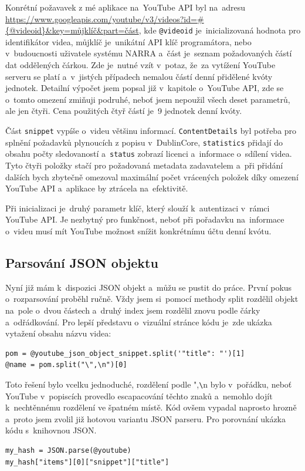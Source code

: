 \par Konrétní požavavek z mé aplikace na~YouTube API byl na~adresu \url{https://www.googleapis.com/youtube/v3/videos?id=#{@videoid}&key=můjklíč}\hfill \break \url{&part=část}\cite{apiurl}, kde \texttt{@videoid} je~inicializovaná hodnota pro identifikátor videa, můjklíč je~unikátní API klíč programátora, nebo v~budoucnosti uživatele systému NARRA a~část je~seznam požadovaných částí dat oddělených čárkou. Zde je~nutné vzít v~potaz, že~za vytížení YouTube serveru se platí a~v~jistých případech nemalou částí denní přidělené kvóty\cite{googleconsole1} jednotek. Detailní výpočet jsem popsal již v~kapitole o~YouTube API, zde se o~tomto omezení zmiňuji podruhé, neboť jsem nepoužil všech deset parametrů, ale jen čtyři. Cena použitých čtyř částí je~9 jednotek denní kvóty.
\par Část \texttt{snippet} vypíše o~videu většinu informací. \texttt{ContentDetails} byl potřeba pro splnění požadavků plynoucích z popisu v~DublinCore, \texttt{statistics} přidají do obsahu počty sledovaností a~\texttt{status} zobrazí licenci a~informace o~sdílení videa. Tyto čtyři položky stačí pro požadovaná metadata zadavatelem a~při přidání dalších bych zbytečně omezoval maximální počet vrácených položek díky omezení YouTube API a~aplikace by ztrácela na~efektivitě.
\par Při inicializaci je~druhý parametr klíč, který slouží k~autentizaci v~rámci YouTube API. Je nezbytný pro funkčnost, neboť při pořadavku na~informace o~videu musí mít YouTube možnost snížit konkrétnímu účtu denní kvótu.

\subsection{Parsování JSON objektu}
\par Nyní již mám k~dispozici JSON objekt a~můžu se pustit do práce. První pokus o~rozparsování proběhl ručně. Vždy jsem si~pomocí methody split rozdělil objekt na~pole o~dvou částech a~druhý index jsem rozdělil znovu podle čárky a~odřádkování. Pro lepší představu o~vizuální stránce kódu je~zde ukázka vytažení obsahu názvu videa:
\begin{verbatim}
pom = @youtube_json_object_snippet.split('"title": "')[1]
@name = pom.split("\",\n")[0]
\end{verbatim}
\par Toto řešení bylo vcelku jednoduché, rozdělení podle ",\verb|\|n bylo v~pořádku, neboť YouTube v~popiscích provedlo escapacování těchto znaků a~nemohlo dojít k~nechtěnnému rozdělení ve špatném místě. Kód ovšem vypadal naprosto hrozně a~proto jsem zvolil již hotovou variantu JSON parseru. Pro porovnání ukázka kódu s~knihovnou JSON.
\begin{verbatim}
my_hash = JSON.parse(@youtube)
my_hash["items"][0]["snippet"]["title"]
\end{verbatim}

